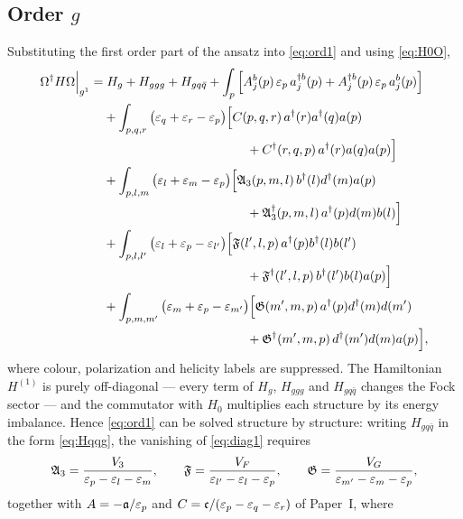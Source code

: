 \subsection{Order $g$}

Substituting the first order part of the ansatz into \eqref{eq:ord1} and using \eqref{eq:H0O},
\begin{align}
\OM^{\dg}H\OM\Big|_{g^{1}}=&\;H_{g}+H_{ggg}+H_{gq\bar q}
+\int_{p}\Big[A^{b}_{j}(p)\,\eps_{p}\,a^{\dg b}_{j}(p)+A^{\dg b}_{j}(p)\,\eps_{p}\,a^{b}_{j}(p)\Big]
\nonumber\\
&+\int_{p,q,r}\big(\eps_{q}+\eps_{r}-\eps_{p}\big)\Big[C(p,q,r)\,a^{\dg}(r)a^{\dg}(q)a(p)
\nonumber\\&\hspace{4cm}+C^{\dg}(r,q,p)\,a^{\dg}(r)a(q)a(p)\Big]
\nonumber\\
&+\int_{p,l,m}\big(\eps_{l}+\eps_{m}-\eps_{p}\big)\Big[\mf A_{3}(p,m,l)\,b^{\dg}(l)d^{\dg}(m)a(p)
\nonumber\\&\hspace{4cm}+\mf A^{\dg}_{3}(p,m,l)\,a^{\dg}(p)d(m)b(l)\Big]
\nonumber\\
&+\int_{p,l,l'}\big(\eps_{l}+\eps_{p}-\eps_{l'}\big)\Big[\mf F(l',l,p)\,a^{\dg}(p)b^{\dg}(l)b(l')
\nonumber\\&\hspace{4cm}+\mf F^{\dg}(l',l,p)\,b^{\dg}(l')b(l)a(p)\Big]
\nonumber\\
&+\int_{p,m,m'}\big(\eps_{m}+\eps_{p}-\eps_{m'}\big)\Big[\mf G(m',m,p)\,a^{\dg}(p)d^{\dg}(m)d(m')
\nonumber\\&\hspace{4cm}+\mf G^{\dg}(m',m,p)\,d^{\dg}(m')d(m)a(p)\Big],
\label{eq:diag1}
\end{align}
where colour, polarization and helicity labels are suppressed. The Hamiltonian $H^{(1)}$ is purely
off-diagonal --- every term of $H_{g}$, $H_{ggg}$ and $H_{gq\bar q}$ changes the Fock sector --- and the
commutator with $H_{0}$ multiplies each structure by its energy imbalance. Hence \eqref{eq:ord1} can
be solved structure by structure: writing $H_{gq\bar q}$ in the form \eqref{eq:Hqqg}, the vanishing of
\eqref{eq:diag1} requires
\begin{equation}
\mathfrak{A}_{3}=\frac{V_{3}}{\varepsilon_{p}-\varepsilon_{l}-\varepsilon_{m}},\qquad
\mathfrak{F}=\frac{V_{F}}{\varepsilon_{l'}-\varepsilon_{l}-\varepsilon_{p}},\qquad
\mathfrak{G}=\frac{V_{G}}{\varepsilon_{m'}-\varepsilon_{m}-\varepsilon_{p}},
\label{eq:diagsol}
\end{equation}
together with $A=-\mathfrak{a}/\varepsilon_{p}$ and $C=\mathfrak{c}/(\varepsilon_{p}-\varepsilon_{q}-\varepsilon_{r})$ of Paper~I, where
